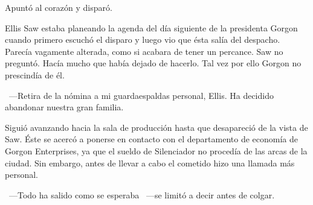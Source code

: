 Apuntó al corazón y disparó.

Ellis Saw estaba planeando la agenda del día siguiente de la presidenta Gorgon cuando primero escuchó el disparo y luego vio que ésta salía del despacho. Parecía vagamente alterada, como si acabara de tener un percance. Saw no preguntó. Hacía mucho que había dejado de hacerlo. Tal vez por ello Gorgon no prescindía de él.

~---Retira de la nómina a mi guardaespaldas personal, Ellis. Ha decidido abandonar nuestra gran familia.

Siguió avanzando hacia la sala de producción hasta que desapareció de la vista de Saw. Éste se acercó a ponerse en contacto con el departamento de economía de Gorgon Enterprises, ya que el sueldo de Silenciador no procedía de las arcas de la ciudad. Sin embargo, antes de llevar a cabo el cometido hizo una llamada más personal.

~---Todo ha salido como se esperaba ~---se limitó a decir antes de colgar.

\endinput
